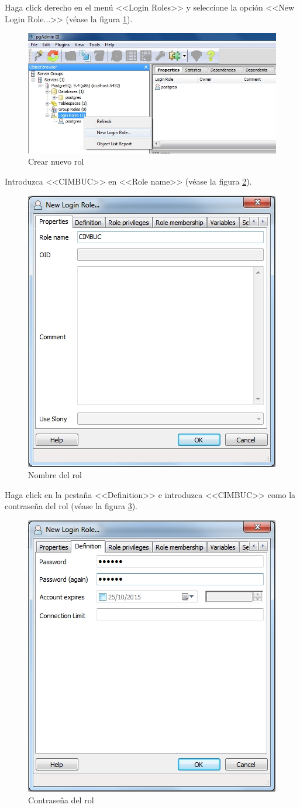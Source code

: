 Haga click derecho en el men\'{u} <<Login Roles>> y seleccione la opci\'{o}n <<New Login Role...>> (v\'{e}ase la figura \ref{fig:pgadmin-rol}).
\vfill
\begin{figure}[H]
  \centering
  \includegraphics[width=1\linewidth]{./img/pgadmin-rol.jpg}
\caption[]{Crear nuevo rol\label{fig:pgadmin-rol}}
\end{figure}
\vfill
Introduzca <<CIMBUC>> en <<Role name>> (v\'{e}ase la figura \ref{fig:pgadmin-rol-nombre}).
\vfill
\begin{figure}[H]
  \centering
  \includegraphics[width=.5\linewidth]{./img/pgadmin-rol-nombre.jpg}
\caption[]{Nombre del rol\label{fig:pgadmin-rol-nombre}}
\end{figure}
\vfill
Haga click en la pesta\~{n}a <<Definition>> e introduzca <<CIMBUC>> como la contrase\~{n}a del rol (v\'{e}ase la figura \ref{fig:pgadmin-rol-clave}).
\vfill
\begin{figure}[H]
  \centering
  \includegraphics[width=.45\linewidth]{./img/pgadmin-rol-clave.jpg}
\caption[]{Contrase\~{n}a del rol\label{fig:pgadmin-rol-clave}}
\end{figure}

